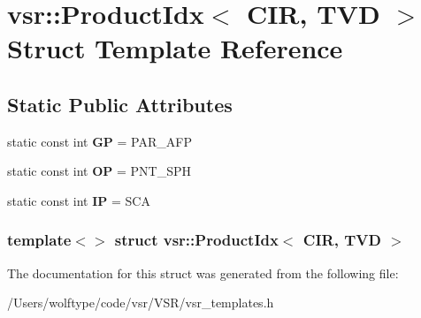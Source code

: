 \hypertarget{structvsr_1_1_product_idx_3_01_c_i_r_00_01_t_v_d_01_4}{\section{vsr\-:\-:Product\-Idx$<$ C\-I\-R, T\-V\-D $>$ Struct Template Reference}
\label{structvsr_1_1_product_idx_3_01_c_i_r_00_01_t_v_d_01_4}
}
\subsection*{Static Public Attributes}
\begin{DoxyCompactItemize}
\item 
\hypertarget{structvsr_1_1_product_idx_3_01_c_i_r_00_01_t_v_d_01_4_a757166b6c357a9a84417d28f1596c4c2}{static const int {\bfseries G\-P} = P\-A\-R\-\_\-\-A\-F\-P}\label{structvsr_1_1_product_idx_3_01_c_i_r_00_01_t_v_d_01_4_a757166b6c357a9a84417d28f1596c4c2}

\item 
\hypertarget{structvsr_1_1_product_idx_3_01_c_i_r_00_01_t_v_d_01_4_a68ea980ae00c9ad1b201c558c0011782}{static const int {\bfseries O\-P} = P\-N\-T\-\_\-\-S\-P\-H}\label{structvsr_1_1_product_idx_3_01_c_i_r_00_01_t_v_d_01_4_a68ea980ae00c9ad1b201c558c0011782}

\item 
\hypertarget{structvsr_1_1_product_idx_3_01_c_i_r_00_01_t_v_d_01_4_a1ac7d2cd284f69bf476f282c01f71b40}{static const int {\bfseries I\-P} = S\-C\-A}\label{structvsr_1_1_product_idx_3_01_c_i_r_00_01_t_v_d_01_4_a1ac7d2cd284f69bf476f282c01f71b40}

\end{DoxyCompactItemize}
\subsubsection*{template$<$$>$ struct vsr\-::\-Product\-Idx$<$ C\-I\-R, T\-V\-D $>$}



The documentation for this struct was generated from the following file\-:\begin{DoxyCompactItemize}
\item 
/\-Users/wolftype/code/vsr/\-V\-S\-R/vsr\-\_\-templates.\-h\end{DoxyCompactItemize}
